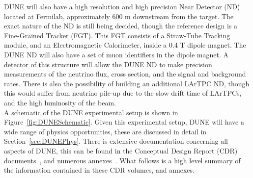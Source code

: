 DUNE will also have a high resolution and high precision Near Detector (ND) located at Fermilab, approximately 600 m downstream from the target. The exact nature of the ND is still being decided, though the reference design is a Fine-Grained Tracker (FGT). This FGT consists of a Straw-Tube Tracking module, and an Electromagnetic Calorimeter, inside a 0.4 T dipole magnet. The DUNE ND will also have a set of muon identifiers in the dipole magnet. A detector of this structure will allow the DUNE ND to make precision measurements of the neutrino flux, cross section, and the signal and background rates. There is also the possibility of building an additional LArTPC ND, though this would suffer from neutrino pile-up due to the slow drift time of LArTPCs, and the high luminosity of the beam. \\

A schematic of the DUNE experimental setup is shown in Figure~\ref{fig:DUNESchematic}. Given this experimental setup, DUNE will have a wide range of physics opportunities, these are discussed in detail in Section~\ref{sec:DUNEPhys}. There is extensive documentation concerning all aspects of DUNE, this can be found in the Conceptual Design Report (CDR) documents~\citep{DUNECDR_V1, DUNECDR_V2, DUNECDR_V3, DUNECDR_V4}, and numerous annexes~\citep{DUNEAtWork}. What follows is a high level summary of the information contained in these CDR volumes, and annexes. \\ 


